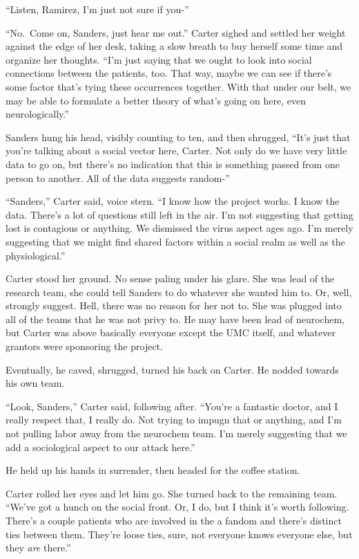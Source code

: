 ``Listen, Ramirez, I'm just not sure if you-''

``No.~Come on, Sanders, just hear me out.'' Carter sighed and settled her weight against the edge of her desk, taking a slow breath to buy herself some time and organize her thoughts. ``I'm just saying that we ought to look into social connections between the patients, too. That way, maybe we can see if there's some factor that's tying these occurrences together. With that under our belt, we may be able to formulate a better theory of what's going on here, even neurologically.''

Sanders hung his head, visibly counting to ten, and then shrugged, ``It's just that you're talking about a social vector here, Carter. Not only do we have very little data to go on, but there's no indication that this is something passed from one person to another. All of the data suggests random-''

``Sanders,'' Carter said, voice stern. ``I know how the project works. I know the data. There's a lot of questions still left in the air. I'm not suggesting that getting lost is contagious or anything. We dismissed the virus aspect ages ago. I'm merely suggesting that we might find shared factors within a social realm as well as the physiological.''

Carter stood her ground. No sense paling under his glare. She was lead of the research team, she could tell Sanders to do whatever she wanted him to. Or, well, strongly suggest. Hell, there was no reason for her not to. She was plugged into all of the teams that he was not privy to. He may have been lead of neurochem, but Carter was above basically everyone except the UMC itself, and whatever grantors were sponsoring the project.

Eventually, he caved, shrugged, turned his back on Carter. He nodded towards his own team.

``Look, Sanders,'' Carter said, following after. ``You're a fantastic doctor, and I really respect that, I really do. Not trying to impugn that or anything, and I'm not pulling labor away from the neurochem team. I'm merely suggesting that we add a sociological aspect to our attack here.''

He held up his hands in surrender, then headed for the coffee station.

Carter rolled her eyes and let him go. She turned back to the remaining team. ``We've got a hunch on the social front. Or, I do, but I think it's worth following. There's a couple patients who are involved in the a fandom and there's distinct ties between them. They're loose ties, sure, not everyone knows everyone else, but they \emph{are} there.''

